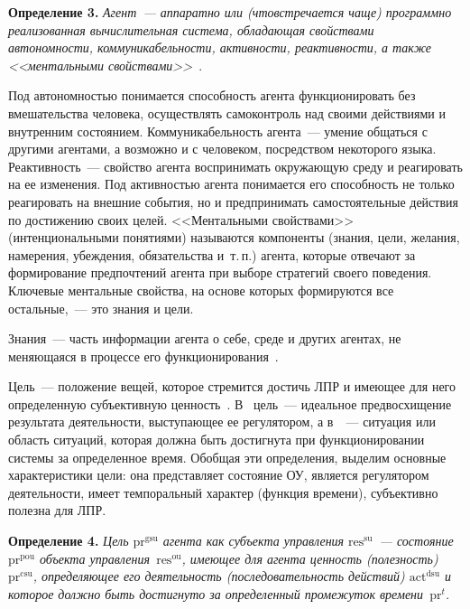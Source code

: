 \begin{multicols}{2}
  \noindent
  \textbf{Определение 3.} \textit{Агент~--- аппаратно или (что\linebreak встречается 
чаще) программно реализованная вы\-чис\-лительная система, обладающая 
свойствами автономности, коммуникабельности, активности, реактивности, 
а также <<ментальными свойствами>>}~\cite{9kir}.
  
  \smallskip
  
  Под автономностью понимается способность агента функционировать без 
вмешательства человека, осуществлять самоконтроль над своими действиями и 
внутренним состоянием. Коммуникабельность агента~--- умение общаться с 
другими агентами, а возможно и с человеком, посредством некоторого языка. 
Реактивность~--- свойство агента воспринимать окружающую среду и 
реагировать на ее изменения. Под активностью агента понимается его 
способность не только реагировать на внешние события, но и предпринимать 
самостоятельные действия по достижению своих целей. <<Ментальными 
свойствами>> (интенциональными понятиями) называются компоненты 
(знания, цели, желания, намерения, убеждения, обязательства и~т.\,п.) агента, 
которые отвечают за формирование предпочтений агента при выборе стратегий 
своего поведения. Ключевые ментальные свойства, на основе которых 
формируются все остальные,~--- это знания и цели.
  
  Знания~--- часть информации агента о себе, среде и других агентах, не 
меняющаяся в процессе его функционирования~\cite{10kir}.
  
  Цель~--- положение вещей, которое стремится достичь ЛПР и имеющее для 
него определенную субъективную ценность~\cite{5kir}. В~\cite{11kir}
цель~--- идеальное предвосхищение результата деятельности, выступающее ее 
регулятором, а в~\cite{12kir}~--- ситуация или область ситуаций, которая 
должна быть достигнута при функционировании системы за определенное 
время. Обобщая эти определения, выделим основные характеристики цели: она 
представляет состояние ОУ, является регулятором деятельности, имеет 
темпоральный характер (функция времени), субъективно полезна для ЛПР.
  
  \smallskip
  
  \noindent
  \textbf{Определение 4.} \textit{Цель $\mathrm{pr}^{\mathrm{gsu}}$ агента как субъекта 
управления $\mathrm{res}^{\mathrm{su}}$~--- состояние $\mathrm{pr}^{\mathrm{pou}}$ объекта 
управ\-ле\-ния~$\mathrm{res}^{\mathrm{ou}}$, 
имеющее для агента ценность (полезность) $\mathrm{pr}^{\mathrm{csu}}$, определяющее его 
деятельность (последовательность действий) $\mathrm{act}^{\mathrm{dsu}}$ и которое должно 
быть достигнуто за определенный промежуток времени~$\mathrm{pr}^t$.}
  

\end{multicols}

